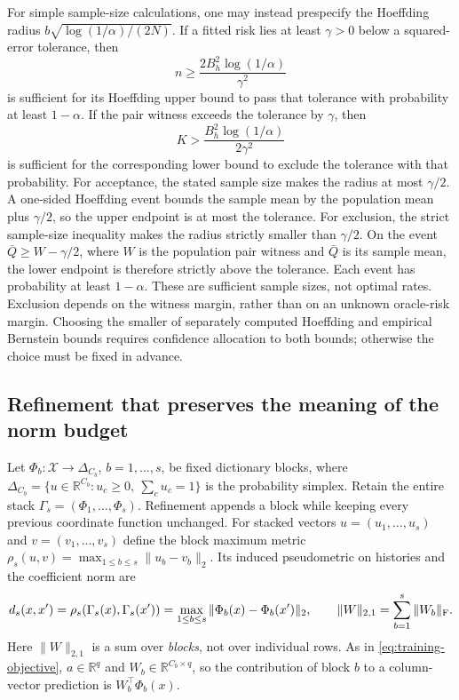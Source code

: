 For simple sample-size calculations, one may instead prespecify the
Hoeffding radius $b\sqrt{\log(1/\alpha)/(2N)}$. If a fitted risk lies
at least $\gamma>0$ below a squared-error tolerance, then
\[
 n\geq\frac{2B_h^2\log(1/\alpha)}{\gamma^2}
\]
is sufficient for its Hoeffding upper bound to pass that tolerance with
probability at least $1-\alpha$. If the pair witness exceeds the tolerance
by $\gamma$, then
\[
 K>\frac{B_h^2\log(1/\alpha)}{2\gamma^2}
\]
is sufficient for the corresponding lower bound to exclude the tolerance
with that probability. For acceptance, the stated sample size makes the
radius at most $\gamma/2$. A one-sided Hoeffding event bounds the sample
mean by the population mean plus $\gamma/2$, so the upper endpoint is
at most the tolerance. For exclusion, the strict sample-size inequality
makes the radius strictly smaller than $\gamma/2$. On the event $\bar Q\geq W-\gamma/2$, where $W$ is the population
pair witness and $\bar Q$ is its sample mean, the lower endpoint is
therefore strictly above the tolerance. Each event has probability at least $1-\alpha$.
These are sufficient sample sizes, not optimal rates. Exclusion depends on the witness margin, rather than on an unknown
oracle-risk margin. Choosing the smaller of separately computed Hoeffding
and empirical Bernstein bounds requires confidence allocation to both
bounds; otherwise the choice must be fixed in advance.

\subsection{Refinement that preserves the meaning of the norm budget}

Let $\Phi_b:\mathcal X\to\Delta_{C_b}$, $b=1,\ldots,s$, be fixed
dictionary blocks, where
$\Delta_{C_b}=\{u\in\mathbb R^{C_b}:u_c\geq0,\ \sum_cu_c=1\}$
is the probability simplex. Retain the entire stack
$\Gamma_s=(\Phi_1,\ldots,\Phi_s)$. Refinement appends a block while
keeping every previous coordinate function unchanged. For stacked
vectors $u=(u_1,\ldots,u_s)$ and $v=(v_1,\ldots,v_s)$ define the block
maximum metric $\rho_s(u,v)=\max_{1\leq b\leq s}\|u_b-v_b\|_2$.
Its induced pseudometric on histories and the coefficient norm are
\begin{equation}
 d_s(x,x')=\rho_s(\Gamma_s(x),\Gamma_s(x'))
          =\max_{1\leq b\leq s}\|\Phi_b(x)-\Phi_b(x')\|_2,
 \qquad
 \|W\|_{2,1}=\sum_{b=1}^s\|W_b\|_{\rm F}.
 \label{eq:block-geometry}
\end{equation}
Here $\|W\|_{2,1}$ is a sum over \emph{blocks}, not over individual
rows. As in \eqref{eq:training-objective}, $a\in\mathbb R^q$ and
$W_b\in\mathbb R^{C_b\times q}$, so the contribution of block $b$
to a column-vector prediction is $W_b^\top\Phi_b(x)$.

